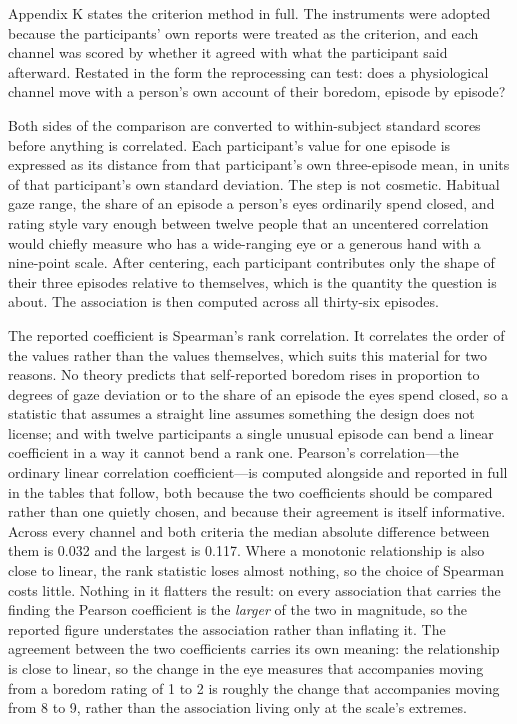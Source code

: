 Appendix K states the criterion method in full. The instruments were adopted because the
participants' own reports were treated as the criterion, and each channel was scored by
whether it agreed with what the participant said afterward. Restated in the form the
reprocessing can test: does a physiological channel move with a person's own account of their
boredom, episode by episode?

Both sides of the comparison are converted to within-subject standard scores before anything
is correlated. Each participant's value for one episode is expressed as its distance from
that participant's own three-episode mean, in units of that participant's own standard
deviation. The step is not cosmetic. Habitual gaze range, the share of an episode a person's
eyes ordinarily spend closed, and rating style vary enough between twelve people that an
uncentered correlation would chiefly measure who has a wide-ranging eye or a generous hand
with a nine-point scale. After centering, each participant contributes only the shape of
their three episodes relative to themselves, which is the quantity the question is about. The
association is then computed across all thirty-six episodes.

The reported coefficient is Spearman's rank correlation. It correlates the order of the values
rather than the values themselves, which suits this material for two reasons. No theory
predicts that self-reported boredom rises in proportion to degrees of gaze deviation or to
the share of an episode the eyes spend closed, so a statistic that assumes a straight line
assumes something the design does not license; and with twelve participants a single unusual
episode can bend a linear coefficient in a way it cannot bend a rank one. Pearson's
correlation---the ordinary linear correlation coefficient---is computed alongside and
reported in full in the tables that follow, both because the two coefficients should be
compared rather than one quietly chosen, and because their agreement is itself informative.
Across every channel and both criteria the median absolute difference between them is 0.032
and the largest is 0.117. Where a monotonic relationship is also close to linear, the rank
statistic loses almost nothing, so the choice of Spearman costs little. Nothing in it
flatters the result: on every association that carries the finding the Pearson coefficient is
the \textit{larger} of the two in magnitude, so the reported figure understates the
association rather than inflating it. The agreement between the two coefficients carries its
own meaning: the relationship is close to linear, so the change in the eye measures that
accompanies moving from a boredom rating of 1 to 2 is roughly the change that accompanies
moving from 8 to 9, rather than the association living only at the scale's extremes.

